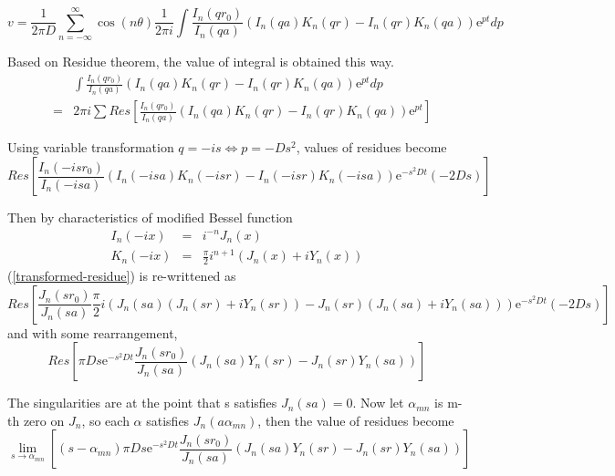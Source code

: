 \documentclass{article}
\begin{document}
\begin{equation}\label{v-form-not-integrated}
    v = \frac{1}{2\pi D}\sum_{n=-\infty}^{\infty}\cos(n\theta)
        \frac{1}{2\pi i}\int \frac{I_n(qr_0)}{I_n(qa)}(I_n(qa)K_n(qr) - I_n(qr)K_n(qa))
        \mathrm{e}^{pt} dp
\end{equation}

Based on Residue theorem, the value of integral is obtained this way.
\begin{eqnarray}
    & & \int \frac{I_n(qr_0)}{I_n(qa)}(I_n(qa)K_n(qr) - I_n(qr)K_n(qa))\mathrm{e}^{pt}dp
    \nonumber\\
    &=& 2 \pi i \sum Res\left[\frac{I_n(qr_0)}{I_n(qa)}(I_n(qa)K_n(qr) - I_n(qr)K_n(qa))
        \mathrm{e}^{pt}\right]
\end{eqnarray}

Using variable transformation $q = -is \Leftrightarrow p = -Ds^2$, values of residues become
\begin{equation}
    Res\left[\frac{I_n(-isr_0)}{I_n(-isa)}(I_n(-isa)K_n(-isr) - I_n(-isr)K_n(-isa))
    \mathrm{e}^{-s^2Dt}(-2Ds)\right]\label{transformed-residue}
\end{equation}

Then by characteristics of modified Bessel function
\begin{eqnarray}
    I_n(-ix) &=& i^{-n}J_n(x)\nonumber \\
    K_n(-ix) &=& \frac{\pi}{2}i^{n+1}(J_n(x)+iY_n(x))\nonumber
\end{eqnarray}
(\ref{transformed-residue}) is re-writtened as
\begin{equation}
    Res\left[\frac{J_n(sr_0)}{J_n(sa)}\frac{\pi}{2}i(J_n(sa)(J_n(sr)+iY_n(sr)) - J_n(sr)(J_n(sa)+iY_n(sa)))
    \mathrm{e}^{-s^2Dt}(-2Ds)\right]
\end{equation}
and with some rearrangement,
\begin{equation}
    Res\left[\pi Ds\mathrm{e}^{-s^2Dt}
        \frac{J_n(sr_0)}{J_n(sa)}(J_n(sa)Y_n(sr) - J_n(sr)Y_n(sa))
       \right]
\end{equation}

The singularities are at the point that s satisfies $J_n(sa) = 0$.
Now let $\alpha_{mn}$ is m-th zero on $J_n$, so each $\alpha$ satisfies $J_n(a\alpha_{mn})$, then the value of residues become
\begin{equation}
    \lim_{s\to\alpha_{mn}} \left[(s-\alpha_{mn})\pi Ds\mathrm{e}^{-s^2Dt}
       \frac{J_n(sr_0)}{J_n(sa)}(J_n(sa)Y_n(sr) - J_n(sr)Y_n(sa))
       \right]
\end{equation}
\end{document}
